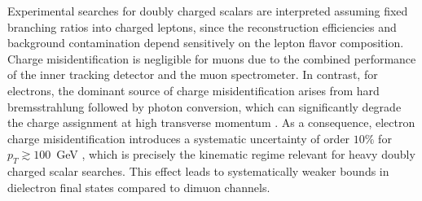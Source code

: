 \documentclass[aps, prev, twocolumn, preprintnumbers, floatfix, nofootinbib]{revtex4-1}
\begin{document}
Experimental searches for doubly charged scalars are interpreted assuming fixed branching ratios into charged leptons, since the reconstruction efficiencies and background contamination depend sensitively on the lepton flavor composition. Charge misidentification is negligible for muons due to the combined performance of the inner tracking detector and the muon spectrometer. In contrast, for electrons, the dominant source of charge misidentification arises from hard bremsstrahlung followed by photon conversion, which can significantly degrade the charge assignment at high transverse momentum \cite{ATLAS:2017xqs}. As a consequence, electron charge misidentification introduces a systematic uncertainty of order $10\%$ for $p_T \gtrsim 100$~GeV \cite{ATLAS:2014kca}, which is precisely the kinematic regime relevant for heavy doubly charged scalar searches. This effect leads to systematically weaker bounds in dielectron final states compared to dimuon channels.
\end{document}
